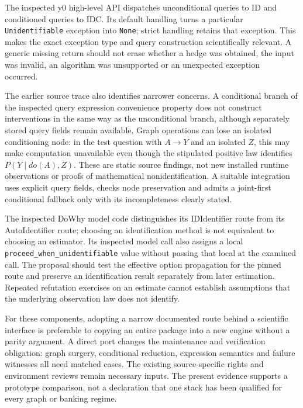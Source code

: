 The inspected y0 high-level API dispatches unconditional
queries to ID and conditioned queries to IDC. Its
default handling turns a particular
\texttt{Unidentifiable} exception into \texttt{None};
strict handling retains that exception. This makes
the exact exception type and query construction
scientifically relevant. A generic missing return
should not erase whether a hedge was obtained, the
input was invalid, an algorithm was unsupported or
an unexpected exception occurred.~\citep{exec13_y0_api,exec13_y0_id,exec13_y0_idc}

The earlier source trace also identifies narrower
concerns. A conditional branch of the inspected query
expression convenience property does not construct
interventions in the same way as the unconditional
branch, although separately stored query fields
remain available. Graph operations can lose an
isolated conditioning node: in the test question
with $A\to Y$ and an isolated $Z$, this may make
computation unavailable even though the stipulated
positive law identifies $P(Y\mid do(A),Z)$.
These are static source findings, not new installed
runtime observations or proofs of mathematical
nonidentification. A suitable integration uses explicit
query fields, checks node preservation and admits a
joint-first conditional fallback only with its
incompleteness clearly stated.~\citep{exec13_y0_api,exec13_y0_graph,exec13_y0_dsl,exec13_y0_utils,exec13_y0_rule2,exec13_y0_separation}

The inspected DoWhy model code distinguishes its
IDIdentifier route from its AutoIdentifier route;
choosing an identification method is not equivalent
to choosing an estimator. Its inspected model call
also assigns a local
\texttt{proceed\_when\_unidentifiable} value without
passing that local at the examined call. The proposal
should test the effective option propagation for
the pinned route and preserve an identification
result separately from later estimation. Repeated
refutation exercises on an estimate cannot establish
assumptions that the underlying observation law
does not identify.~\citep{exec13_dowhy}

For these components, adopting a narrow documented
route behind a scientific interface is preferable
to copying an entire package into a new engine
without a parity argument. A direct port changes
the maintenance and verification obligation:
graph surgery, conditional reduction, expression
semantics and failure witnesses all need matched
cases. The existing source-specific rights and
environment reviews remain necessary inputs.
The present evidence supports a prototype comparison,
not a declaration that one stack has been qualified
for every graph or banking regime.

